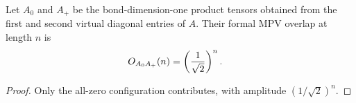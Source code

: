 \begin{lemma}
    \label{thm:cpsv16_example_34_blocked_overlap}
    \leanok
    Let $A_0$ and $A_+$ be the bond-dimension-one product tensors obtained
    from the first and second virtual diagonal entries of $A$. Their formal MPV
    overlap at length $n$ is
    \begin{align}
        O_{A_0A_+}(n)
         & =\left(\frac{1}{\sqrt2}\right)^n.
        \notag
    \end{align}
\end{lemma}

\begin{proof}
    \leanok
    Only the all-zero configuration contributes, with amplitude
    $(1/\sqrt2)^n$.
\end{proof}
